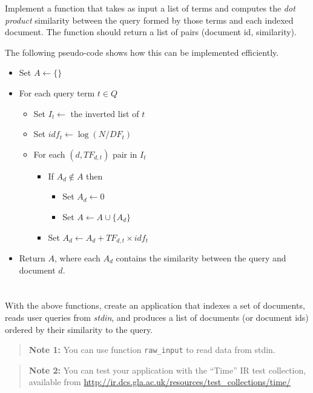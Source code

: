 \documentclass[12pt]{article}
\begin{document}
Implement a function that takes as input a list of terms and computes the
\emph{dot product} similarity between the query formed by those terms and each
indexed document. The function should return a list of pairs (document id,
similarity).

The following pseudo-code shows how this can be implemented efficiently.

\newcommand{\att}{\ensuremath{\leftarrow}}
\newcommand{\fdt}{\ensuremath{TF_{d,t}}}
\begin{itemize}\ttfamily \footnotesize
\item Set $A \att \{\}$
\item For each query term $t \in Q$
    \begin{itemize}
    \item Set $I_t \att$ the inverted list of $t$
    \item Set $idf_t \att \log(N/DF_t)$
    \item For each $(d,\fdt)$ pair in $I_t$
        \begin{itemize}
        \item If $A_d \not\in A$ then
            \begin{itemize}
            \item Set $A_d \att 0$
            \item Set $A \att A \cup \{A_d\}$
            \end{itemize}
        \item Set $A_d \att A_d + \fdt \times idf_t$
        \end{itemize}
    \end{itemize}
\item Return $A$, where each $A_d$ contains the similarity between the query and document $d$.
\end{itemize}

\section{}

With the above functions, create an application that indexes a set of
documents, reads user queries from \emph{stdin}, and produces a list of
documents (or document ids) ordered by their similarity to the query.

\begin{quote}
    \textbf{Note 1:} You can use function \texttt{raw\_input} to read data from
    stdin.
\end{quote}

\begin{quote}
    \textbf{Note 2:} You can test your application with the ``Time'' IR test collection, available from \url{http://ir.dcs.gla.ac.uk/resources/test_collections/time/}
\end{quote}
\end{document}
